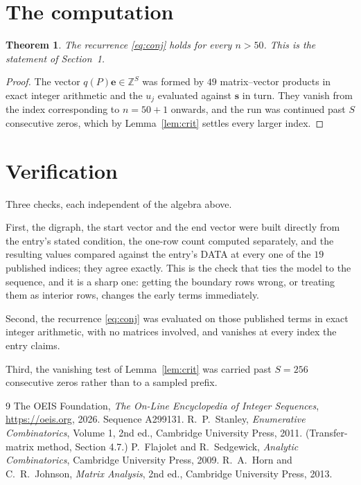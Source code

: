 \documentclass[11pt,a4paper]{article}
\theoremstyle{plain}
\newtheorem{theorem}{Theorem}
\theoremstyle{definition}
\begin{document}
\section{The computation}

\begin{theorem}
The recurrence \eqref{eq:conj} holds for every $n>50$. This is the statement of
Section~1.
\end{theorem}

\begin{proof}
The vector $q(P)\mathbf{e}\in\mathbb{Z}^{S}$ was formed by $49$ matrix--vector
products in exact integer arithmetic and the $u_j$ evaluated against $\mathbf{s}$ in turn.
They vanish from the index corresponding to $n=50+1$ onwards, and the run was continued
past $S$ consecutive zeros, which by Lemma~\ref{lem:crit} settles every larger index.
\end{proof}

\section{Verification}

Three checks, each independent of the algebra above.

First, the digraph, the start vector and the end vector were built directly from the
entry's stated condition, the one-row count computed separately, and the resulting values
compared against the entry's DATA at every one of the $19$ published indices; they
agree exactly. This is the check that ties the model to the sequence, and it is a sharp one:
getting the boundary rows wrong, or treating them as interior rows, changes the early terms
immediately.

Second, the recurrence \eqref{eq:conj} was evaluated on those published terms in exact
integer arithmetic, with no matrices involved, and vanishes at every index the entry claims.

Third, the vanishing test of Lemma~\ref{lem:crit} was carried past $S=256$ consecutive
zeros rather than to a sampled prefix.

\begin{thebibliography}{9}
 The OEIS Foundation, \emph{The On-Line Encyclopedia of Integer
Sequences}, \url{https://oeis.org}, 2026. Sequence A299131.
 R.~P.~Stanley, \emph{Enumerative Combinatorics}, Volume 1, 2nd ed.,
Cambridge University Press, 2011. (Transfer-matrix method, Section 4.7.)
 P.~Flajolet and R.~Sedgewick, \emph{Analytic Combinatorics}, Cambridge
University Press, 2009.
 R.~A.~Horn and C.~R.~Johnson, \emph{Matrix Analysis}, 2nd ed., Cambridge
University Press, 2013.
\end{thebibliography}
\end{document}
